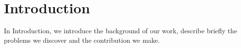\section{Introduction}
\label{sec:intro}
In Introduction, we introduce the background of our work, describe briefly the problems we discover and the contribution we make.